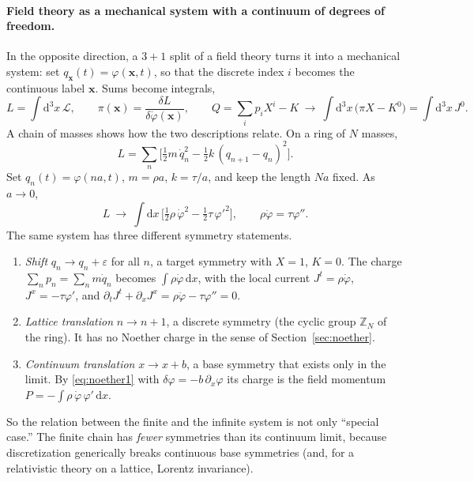 \documentclass[11pt,a4paper,openany]{book}
\theoremstyle{definition}
\theoremstyle{plain}
\theoremstyle{remark}
\newcommand{\dd}{\mathrm{d}}
\newcommand{\eps}{\varepsilon}
\newcommand{\vx}{\bm{x}}
\begin{document}
\paragraph{Field theory as a mechanical system with a continuum of degrees of
freedom.}
In the opposite direction, a $3{+}1$ split of a field theory turns it into a
mechanical system: set $q_{\vx}(t)=\varphi(\vx,t)$, so that the discrete index
$i$ becomes the continuous label $\vx$. Sums become integrals,
\begin{equation}
  L=\int\dd^3x\,\mathcal L,\qquad
  \pi(\vx)=\frac{\delta L}{\delta\dot\varphi(\vx)},\qquad
  Q=\sum_ip_iX^i-K\ \longrightarrow\ \int\dd^3x\,\big(\pi X-K^0\big)=\int\dd^3x\,J^0 .
\end{equation}
A chain of masses shows how the two descriptions relate. On a ring of $N$
masses,
\begin{equation}
  L=\sum_{n}\Big[\tfrac12m\,\dot q_n^2-\tfrac12k\,(q_{n+1}-q_n)^2\Big].
\end{equation}
Set $q_n(t)=\varphi(na,t)$, $m=\rho a$, $k=\tau/a$, and keep the length $Na$
fixed. As $a\to0$,
\begin{equation}
  L\ \to\ \int\dd x\,\Big[\tfrac12\rho\,\dot\varphi^2-\tfrac12\tau\,\varphi'^2\Big],
  \qquad\rho\ddot\varphi=\tau\varphi'' .
\end{equation}
The same system has three different symmetry statements.
\begin{enumerate}[leftmargin=1.8em,itemsep=3pt,label=\textbf{\arabic*.}]
\item \emph{Shift} $q_n\to q_n+\eps$ for all $n$, a target symmetry with $X=1$,
  $K=0$. The charge $\sum_np_n=\sum_nm\dot q_n$ becomes $\int\rho\dot\varphi\,\dd x$,
  with the local current $J^t=\rho\dot\varphi$, $J^x=-\tau\varphi'$, and
  $\partial_tJ^t+\partial_xJ^x=\rho\ddot\varphi-\tau\varphi''=0$.
\item \emph{Lattice translation} $n\to n+1$, a discrete symmetry (the cyclic group
  $\mathbb Z_N$ of the ring). It has no Noether charge in the sense of
  Section~\ref{sec:noether}.
\item \emph{Continuum translation} $x\to x+b$, a base symmetry that exists only
  in the limit. By \eqref{eq:noether1} with $\delta\varphi=-b\,\partial_x\varphi$
  its charge is the field momentum $P=-\int\rho\,\dot\varphi\,\varphi'\,\dd x$.
\end{enumerate}
So the relation between the finite and the infinite system is not only
``special case.'' The finite chain has \emph{fewer} symmetries than its
continuum limit, because discretization generically breaks continuous base
symmetries (and, for a relativistic theory on a lattice, Lorentz invariance).
\end{document}
